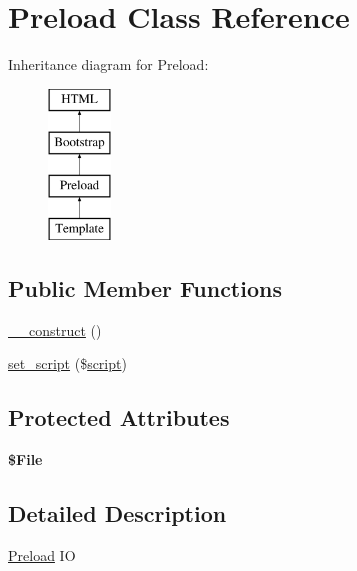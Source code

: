 \hypertarget{class_w_a_f_f_l_e_1_1_framework_1_1_i_o_1_1_preload}{}\section{Preload Class Reference}
\label{class_w_a_f_f_l_e_1_1_framework_1_1_i_o_1_1_preload}
Inheritance diagram for Preload\+:\begin{figure}[H]
\begin{center}
\leavevmode
\includegraphics[height=4.000000cm]{class_w_a_f_f_l_e_1_1_framework_1_1_i_o_1_1_preload}
\end{center}
\end{figure}
\subsection*{Public Member Functions}
\begin{DoxyCompactItemize}
\item 
\hyperlink{class_w_a_f_f_l_e_1_1_framework_1_1_i_o_1_1_preload_a095c5d389db211932136b53f25f39685}{\+\_\+\+\_\+construct} ()
\item 
\hyperlink{class_w_a_f_f_l_e_1_1_framework_1_1_i_o_1_1_preload_aa570cf9af0fc24953f4568db3a71ae7b}{set\+\_\+script} (\$\hyperlink{class_w_a_f_f_l_e_1_1_framework_1_1_engines_1_1_h_t_m_l_a9a92856db6ac937a9dace60224dfaf65}{script})
\end{DoxyCompactItemize}
\subsection*{Protected Attributes}
\begin{DoxyCompactItemize}
\item 
\mbox{\label{class_w_a_f_f_l_e_1_1_framework_1_1_i_o_1_1_preload_a34cd105e27a4cb6632047ddfdfaa07e8}} 
{\bfseries \$\+File}
\end{DoxyCompactItemize}


\subsection{Detailed Description}
\hyperlink{class_w_a_f_f_l_e_1_1_framework_1_1_i_o_1_1_preload}{Preload} IO

